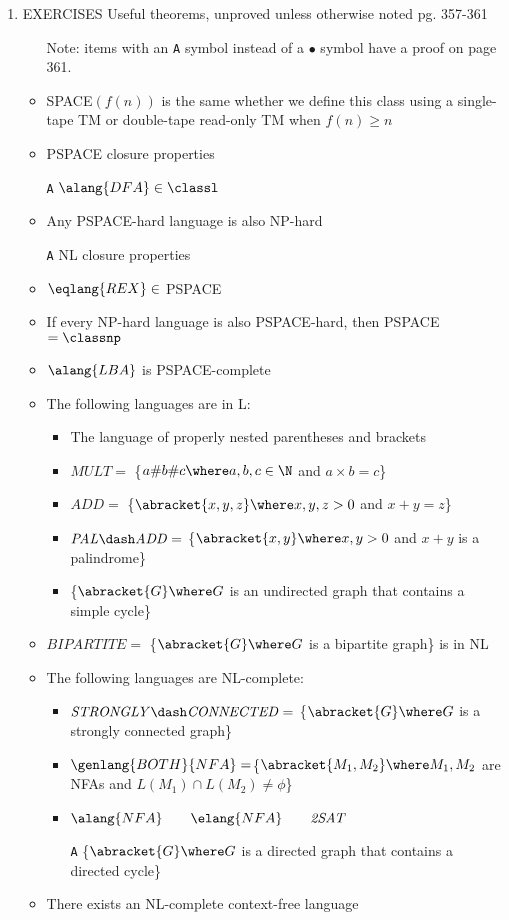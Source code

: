 \documentclass[12pt]{article} %
\newcommand{\theoremitem}[3]{\item #1 \quad #2 \dotfill #3}
\newenvironment{theoremlist} {
    \begin{enumerate}[nosep,leftmargin=*,label={}]
} {
    \end{enumerate}
}
\begin{document}
\begin{theoremlist}
    \theoremitem{EXERCISES}
    {Useful theorems, unproved unless otherwise noted}
    {pg. 357-361}
    \begin{itemize}[nosep]
        \item[] Note: items with an \texttt{A} symbol instead of a $\bullet$ symbol have a proof on page 361.
        \item SPACE$(f(n))$ is the same whether we define this class using a single-tape TM or double-tape read-only TM when $f(n)\geq n$
        \item PSPACE closure properties
        \item[\texttt{A}] $\alang{DFA}\in\classl$
        \item Any PSPACE-hard language is also NP-hard
        \item[\texttt{A}] NL closure properties
        \item $\eqlang{REX}\in$ PSPACE
        \item If every NP-hard language is also PSPACE-hard, then PSPACE $=\classnp$
        \item $\alang{LBA}$ is PSPACE-complete
        \item The following languages are in L:
        \begin{itemize}[label=-]
            \item The language of properly nested parentheses and brackets
            \item $\mathit{MULT}=$ \{$a\#b\#c \where a,b,c\in\N$ and $a\times b = c$\} 
            \item $\mathit{ADD}=$ \{$\abracket{x,y,z} \where x,y,z>0$ and $x+y=z$\} 
            \item $\mathit{PAL\dash ADD}=$ \{$\abracket{x,y} \where x,y>0$ and $x+y$ is a palindrome\} 
            \item \{$\abracket{G} \where G$ is an undirected graph that contains a simple cycle\} 
        \end{itemize}
        \item $\mathit{BIPARTITE}=$ \{$\abracket{G} \where G$ is a bipartite graph\} is in NL
        \item The following languages are NL-complete:
        \begin{itemize}[label=-]
            \item $\mathit{STRONGLY\dash CONNECTED}=$ \{$\abracket{G} \where G$ is a strongly connected graph\}
            \item $\genlang{BOTH}{NFA}=$\{$\abracket{M_1,M_2} \where M_1,M_2$ are NFAs and $L(M_1)\cap L(M_2)\neq\phi$\}
            \item $\alang{NFA}\qquad\elang{NFA}\qquad\mathit{2SAT}$
            \item[\texttt{A}] \{$\abracket{G} \where G$ is a directed graph that contains a directed cycle\}
        \end{itemize}
        \item There exists an NL-complete context-free language
        

\end{itemize}
\end{theoremlist}
\end{document}
